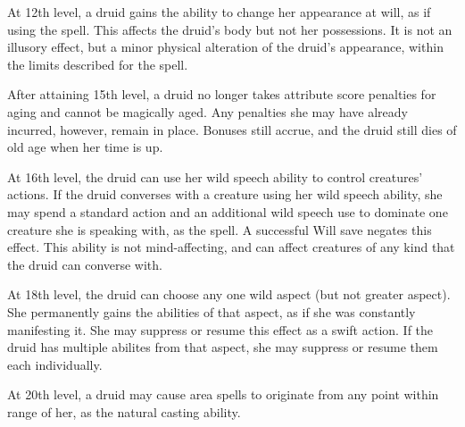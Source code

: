 At 12th level, a druid gains the ability to change
her appearance at will, as if using the  spell. This affects the druid's body but not her possessions. It is not an illusory effect, but a minor physical alteration of the druid's appearance, within the limits described for the spell.

 After attaining 15th level, a druid no longer takes attribute score penalties for aging and cannot be magically aged. Any penalties she may have already incurred, however, remain in place. Bonuses still accrue, and the druid still dies of old age when her time is up.

 At 16th level, the druid can use her wild speech ability to control creatures' actions. If the druid converses with a creature using her wild speech ability, she may spend a standard action and an additional wild speech use to dominate one creature she is speaking with, as the  spell. A successful Will save negates this effect. This ability is not mind-affecting, and can affect creatures of any kind that the druid can converse with.

 At 18th level, the druid can choose any one wild aspect (but not greater aspect). She permanently gains the abilities of that aspect, as if she was constantly manifesting it. She may suppress or resume this effect as a swift action. If the druid has multiple abilites from that aspect, she may suppress or resume them each individually.

 At 20th level, a druid may cause area spells to originate from any point within \rngmed range of her, as the natural casting ability.


